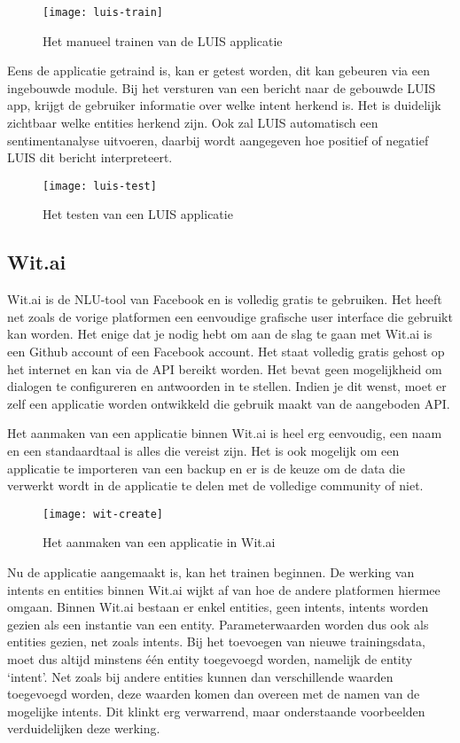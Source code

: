 \begin{figure}[H]
    \label{fig:luis-train}
    \centering
    \texttt{[image: luis-train]}
    \caption{Het manueel trainen van de LUIS applicatie}
\end{figure}

Eens de applicatie getraind is, kan er getest worden, dit kan gebeuren via een ingebouwde module. Bij het versturen van een bericht naar de gebouwde LUIS app, krijgt de gebruiker informatie over welke intent herkend is.
Het is duidelijk zichtbaar welke entities herkend zijn. Ook zal LUIS automatisch een sentimentanalyse uitvoeren, daarbij wordt aangegeven hoe positief of negatief LUIS dit bericht interpreteert.

\begin{figure}[H]
    \label{fig:luis-test}
    \centering
    \texttt{[image: luis-test]}
    \caption{Het testen van een LUIS applicatie}
\end{figure}

\subsection{Wit.ai}
\label{subsec:werking-platformen-wit}

Wit.ai is de NLU-tool van Facebook en is volledig gratis te gebruiken. Het heeft net zoals de vorige platformen een eenvoudige grafische user interface die gebruikt kan worden. Het enige dat je nodig hebt om aan de slag te gaan met Wit.ai is een Github account of een Facebook account. Het staat volledig gratis gehost op het internet en kan via de API bereikt worden. Het bevat geen mogelijkheid om dialogen te configureren en antwoorden in te stellen. Indien je dit wenst, moet er zelf een applicatie worden ontwikkeld die gebruik maakt van de aangeboden API.

Het aanmaken van een applicatie binnen Wit.ai is heel erg eenvoudig, een naam en een standaardtaal is alles die vereist zijn. Het is ook mogelijk om een applicatie te importeren van een backup en er is de keuze om de data die verwerkt wordt in de applicatie te delen met de volledige community of niet.

\begin{figure}[H]
    \label{fig:wit-create}
    \centering
    \texttt{[image: wit-create]}
    \caption{Het aanmaken van een applicatie in Wit.ai}
\end{figure}

Nu de applicatie aangemaakt is, kan het trainen beginnen. De werking van intents en entities binnen Wit.ai wijkt af van hoe de andere platformen hiermee omgaan. Binnen Wit.ai bestaan er enkel entities, geen intents, intents worden gezien als een instantie van een entity. Parameterwaarden worden dus ook als entities gezien, net zoals intents. Bij het toevoegen van nieuwe trainingsdata, moet dus altijd minstens één entity toegevoegd worden, namelijk de entity ‘intent’. Net zoals bij andere entities kunnen dan verschillende waarden toegevoegd worden, deze waarden komen dan overeen met de namen van de mogelijke intents. Dit klinkt erg verwarrend, maar onderstaande voorbeelden verduidelijken deze werking.

